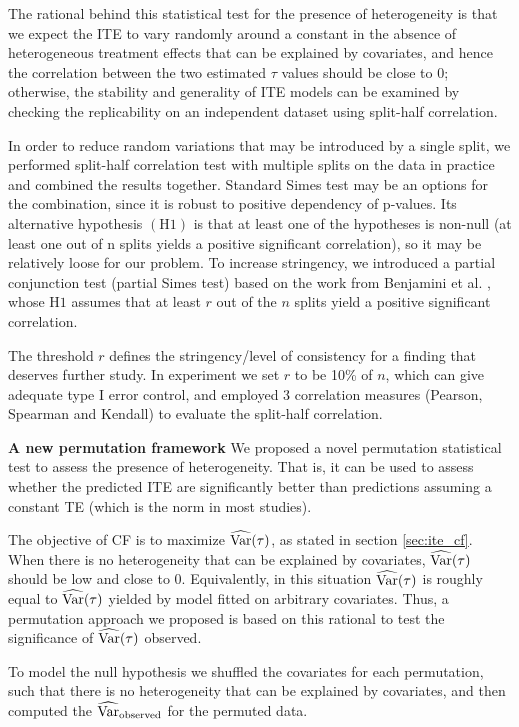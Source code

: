     The rational behind this statistical test for the presence of heterogeneity is that we expect the ITE to vary randomly around a constant in the absence of heterogeneous treatment effects that can be explained by covariates, and hence the correlation between the two estimated $\tau$ values should be close to 0; otherwise, the stability and generality of ITE models can be examined by checking the replicability on an independent dataset using split-half correlation. 
    
    In order to reduce random variations that may be introduced by a single split, we performed split-half correlation test with multiple splits on the data in practice and combined the results together. Standard Simes test \cite{simes1986improved} may be an options for the combination, since it is robust to positive dependency of p-values. Its alternative hypothesis $(\mathrm{H1})$ is that at least one of the hypotheses is non-null (at least one out of n splits yields a positive significant correlation), so it may be relatively loose for our problem. To increase stringency, we introduced a partial conjunction test (partial Simes test) based on the work from Benjamini et al. \cite{benjamini2008screening}, whose $\mathrm{H1}$ assumes that at least $r$ out of the $n$ splits yield a positive significant correlation. 
    
    The threshold $r$ defines the stringency/level of consistency for a finding that deserves further study. In experiment we set $r$ to be 10\% of $n$, which can give adequate type I error control, and employed 3 correlation measures (Pearson, Spearman and Kendall) to evaluate the split-half correlation.
  
    \textbf{A new permutation framework} We proposed a novel permutation statistical test to assess the presence of heterogeneity. That is, it can be used to assess whether the predicted ITE are significantly better than predictions assuming a constant TE (which is the norm in most studies). 

    The objective of CF is to maximize $\operatorname{\widehat{Var}}(\tau)$, as stated in section \ref{sec:ite_cf}. When there is no heterogeneity that can be explained by covariates, $\operatorname{\widehat{Var}}(\tau)$ should be low and close to 0. Equivalently, in this situation $\operatorname{\widehat{Var}}(\tau)$ is roughly equal to $\operatorname{\widehat{Var}}(\tau)$ yielded by model fitted on arbitrary covariates. Thus, a permutation approach we proposed is based on this rational to test the significance of $\operatorname{\widehat{Var}}(\tau)$ observed. 
    
    To model the null hypothesis we shuffled the covariates for each permutation, such that there is no heterogeneity that can be explained by covariates, and then computed the $\operatorname{\widehat{Var}}_\mathrm{observed}$ for the permuted data. 
    

